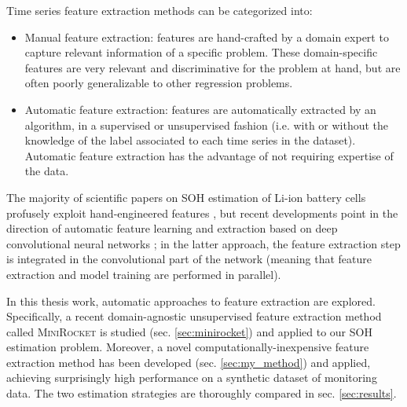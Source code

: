 Time series feature extraction methods can be categorized into:
\begin{itemize}
    \item Manual feature extraction: features are hand-crafted by a domain expert to capture relevant information of a specific problem. These domain-specific features are very relevant and discriminative for the problem at hand, but are often poorly generalizable to other regression problems.
    \item Automatic feature extraction: features are automatically extracted by an algorithm, in a supervised or unsupervised fashion (i.e. with or without the knowledge of the label associated to each time series in the dataset). Automatic feature extraction has the advantage of not requiring expertise of the data.
\end{itemize}

The majority of scientific papers on SOH estimation of Li-ion battery cells profusely exploit hand-engineered features \cite{tesi_filippo, manual_extr_soh_2, manual_extr_soh_3, manual_extr_soh_4, manual_extr_soh_5, manual_extr_soh_6, manual_extr_soh_7, manual_extr_soh_8, manual_extr_soh_9, manual_extr_soh_10, manual_extr_soh_11, manual_extr_soh_12, manual_extr_soh_13}, but recent developments point in the direction of automatic feature learning and extraction based on deep convolutional neural networks \cite{auto_extr_soh_1, auto_extr_soh_2, auto_extr_soh_3, auto_extr_soh_4, auto_extr_soh_5}; in the latter approach, the feature extraction step is integrated in the convolutional part of the network (meaning that feature extraction and model training are performed in parallel).

In this thesis work, automatic approaches to feature extraction are explored. Specifically, a recent domain-agnostic unsupervised feature extraction method called \textsc{MiniRocket} is studied (sec. \ref{sec:minirocket}) and applied to our SOH estimation problem. Moreover, a novel computationally-inexpensive feature extraction method has been developed (sec. \ref{sec:my_method}) and applied, achieving surprisingly high performance on a synthetic dataset of monitoring data. The two estimation strategies are thoroughly compared in sec. \ref{sec:results}.





